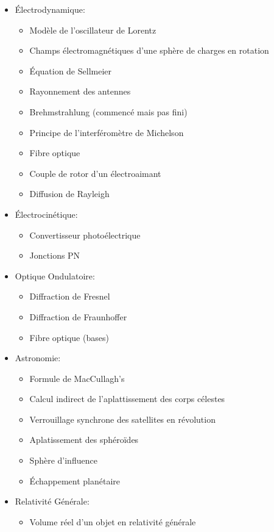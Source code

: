 \begin{itemize}
\begin{itemize}
			\end{itemize}	
		\item Électrodynamique:
			\begin{itemize}		
				\item Modèle de l'oscillateur de Lorentz
				\item Champs électromagnétiques d'une sphère de charges en rotation
				\item Équation de Sellmeier
				\item Rayonnement des antennes
				\item Brehmstrahlung (commencé mais pas fini)
				\item Principe de l'interféromètre de Michelson
				\item Fibre optique
				\item Couple de rotor d'un électroaimant
				\item Diffusion de Rayleigh
			\end{itemize}
		\item Électrocinétique:
			\begin{itemize}		
				\item Convertisseur photoélectrique
				\item Jonctions PN
			\end{itemize}
		\item Optique Ondulatoire:
			\begin{itemize}		
				\item Diffraction de Fresnel
				\item Diffraction de Fraunhoffer
				\item Fibre optique (bases)
			\end{itemize}
		\item Astronomie:
			\begin{itemize}	
				\item Formule de MacCullagh's 
				\item Calcul indirect de l'aplattissement des corps célestes
				\item Verrouillage synchrone des satellites en révolution	
				\item Aplatissement des sphéroïdes
				\item Sphère d'influence
				\item Échappement planétaire
			\end{itemize}		
		\item Relativité Générale:
			\begin{itemize}
				\item Volume réel d'un objet en relativité générale

\end{itemize}
\end{itemize}
